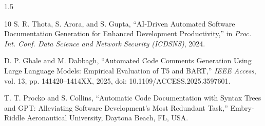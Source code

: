 \documentclass{cls/thesis}
\begin{document}
\begin{spacing}{1.5}
\begin{thebibliography}{10}
S. R. Thota, S. Arora, and S. Gupta,
``AI-Driven Automated Software Documentation Generation for Enhanced Development Productivity,''
in \emph{Proc. Int. Conf. Data Science and Network Security (ICDSNS)}, 2024.

D. P. Ghale and M. Dabbagh,
``Automated Code Comments Generation Using Large Language Models: Empirical Evaluation of T5 and BART,''
\emph{IEEE Access}, vol. 13, pp. 141420--1414XX, 2025, doi: 10.1109/ACCESS.2025.3597601.










T. T. Procko and S. Collins, ``Automatic Code Documentation with Syntax Trees and GPT: Alleviating Software Development’s Most Redundant Task,'' Embry-Riddle Aeronautical University, Daytona Beach, FL, USA.

\end{thebibliography}

% 
% 





















\end{spacing}
\end{document}
